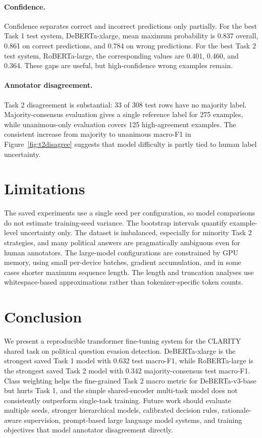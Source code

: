 \documentclass[11pt,twocolumn]{article}
\newcommand{\taskone}{Task 1}
\newcommand{\tasktwo}{Task 2}
\newcommand{\macroF}{macro-F1}
\begin{document}
\paragraph{Confidence.}
Confidence separates correct and incorrect predictions only partially. For the best \taskone{} test system, DeBERTa-xlarge, mean maximum probability is 0.837 overall, 0.861 on correct predictions, and 0.784 on wrong predictions. For the best \tasktwo{} test system, RoBERTa-large, the corresponding values are 0.401, 0.460, and 0.364. These gaps are useful, but high-confidence wrong examples remain.

\paragraph{Annotator disagreement.}
\tasktwo{} disagreement is substantial: 33 of 308 test rows have no majority label. Majority-consensus evaluation gives a single reference label for 275 examples, while unanimous-only evaluation covers 125 high-agreement examples. The consistent increase from majority to unanimous \macroF{} in Figure~\ref{fig:t2disagree} suggests that model difficulty is partly tied to human label uncertainty.

\section{Limitations}

The saved experiments use a single seed per configuration, so model comparisons do not estimate training-seed variance. The bootstrap intervals quantify example-level uncertainty only. The dataset is imbalanced, especially for minority \tasktwo{} strategies, and many political answers are pragmatically ambiguous even for human annotators. The large-model configurations are constrained by GPU memory, using small per-device batches, gradient accumulation, and in some cases shorter maximum sequence length. The length and truncation analyses use whitespace-based approximations rather than tokenizer-specific token counts.

\section{Conclusion}

We present a reproducible transformer fine-tuning system for the CLARITY shared task on political question evasion detection. DeBERTa-xlarge is the strongest saved \taskone{} model with 0.632 test \macroF{}, while RoBERTa-large is the strongest saved \tasktwo{} model with 0.342 majority-consensus test \macroF{}. Class weighting helps the fine-grained \tasktwo{} macro metric for DeBERTa-v3-base but hurts \taskone{}, and the simple shared-encoder multi-task model does not consistently outperform single-task training. Future work should evaluate multiple seeds, stronger hierarchical models, calibrated decision rules, rationale-aware supervision, prompt-based large language model systems, and training objectives that model annotator disagreement directly.



\end{document}
